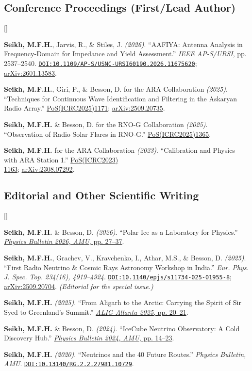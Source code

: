 \documentclass[10pt,letterpaper]{report}
\newcommand{\cvdate}[1]{{\normalfont\itshape\color{Muted}(#1)}}
\newcounter{cvitemrank}
\newenvironment{cvnumbered}[1]{%
  \setcounter{cvitemrank}{#1}%
  \begin{list}{\textcolor{Muted}{[\arabic{cvitemrank}]}}{%
    \setlength{\leftmargin}{2.25em}\setlength{\labelwidth}{1.65em}
    \setlength{\labelsep}{0.45em}\setlength{\itemindent}{0pt}
    \setlength{\itemsep}{0.3pt}\setlength{\topsep}{1.5pt}
    \setlength{\parsep}{0pt}\setlength{\partopsep}{0pt}}%
}{\end{list}}
\newcommand{\cvnumitem}{\item\addtocounter{cvitemrank}{-1}}
\newenvironment{cvpubnumbered}[1]{\begin{cvnumbered}{#1}\setlength{\itemsep}{2.2pt}\setlength{\topsep}{3pt}}{\end{cvnumbered}}
\newcommand{\doi}[1]{{\urlstyle{tt}\href{https://doi.org/#1}{\nolinkurl{DOI:#1}}}}
\newcommand{\arxiv}[1]{\href{https://arxiv.org/abs/#1}{arXiv:#1}}
\begin{document}
\subsection*{Conference Proceedings (First/Lead Author)}
\begin{cvpubnumbered}{4}
    \cvnumitem \textbf{Seikh, M.F.H.}, Jarvis, R., \& Stiles, J. \cvdate{2026}. ``AAFIYA: Antenna Analysis in Frequency-Domain for Impedance and Yield Assessment.'' \textit{IEEE AP-S/URSI}, pp. 2537--2540. \doi{10.1109/AP-S/USNC-URSI60190.2026.11675620}; \arxiv{2601.13583}.
    \cvnumitem \textbf{Seikh, M.F.H.}, Giri, P., \& Besson, D. for the ARA Collaboration \cvdate{2025}. ``Techniques for Continuous Wave Identification and Filtering in the Askaryan Radio Array.'' \href{https://pos.sissa.it/501/1171/pdf}{PoS(ICRC2025)1171}; \arxiv{2509.20735}.
    \cvnumitem \textbf{Seikh, M.F.H.} \& Besson, D. for the RNO-G Collaboration \cvdate{2025}. ``Observation of Radio Solar Flares in RNO-G.'' \href{https://pos.sissa.it/501/1365/pdf}{PoS(ICRC2025)1365}.
    \cvnumitem \textbf{Seikh, M.F.H.} for the ARA Collaboration \cvdate{2023}. ``Calibration and Physics with ARA Station 1.''
    \href{https://pos.sissa.it/444/1163/}{PoS(ICRC2023)\\1163}; \arxiv{2308.07292}.
\end{cvpubnumbered}

\subsection*{Editorial and Other Scientific Writing}
\begin{cvpubnumbered}{5}
    \cvnumitem \textbf{Seikh, M.F.H.} \& Besson, D. \cvdate{2026}. ``Polar Ice as a Laboratory for Physics.'' \href{https://drive.google.com/file/d/1eny09TjrDmNsoqKf86RbFbMdMi_LdEsB/view?usp=share_link}{\textit{Physics Bulletin 2026, AMU}, pp. 27--37}.
    \cvnumitem \textbf{Seikh, M.F.H.}, Grachev, V., Kravchenko, I., Athar, M.S., \& Besson, D. \cvdate{2025}. ``First Radio Neutrino \& Cosmic Rays Astronomy Workshop in India.'' \textit{Eur. Phys. J. Spec. Top. 234(16), 4919--4924}. \doi{10.1140/epjs/s11734-025-01955-8}; \arxiv{2509.20704}. \textit{(Editorial for the special issue.)}
    \cvnumitem \textbf{Seikh, M.F.H.} \cvdate{2025}. ``From Aligarh to the Arctic: Carrying the Spirit of Sir Syed to Greenland's Summit.'' \href{https://www.amuatl.org/publications/1}{\textit{ALIG Atlanta 2025}, pp. 20--21}.
    \cvnumitem \textbf{Seikh, M.F.H.} \& Besson, D. \cvdate{2024}. ``IceCube Neutrino Observatory: A Cold Discovery Hub.'' \href{https://drive.google.com/file/d/1q1vm4tf2Z8iK_Iw3n3kVayBnP7K6tHQI/view?usp=sharing}{\textit{Physics Bulletin 2024, AMU}, pp. 14--23}.
    \cvnumitem \textbf{Seikh, M.F.H.} \cvdate{2020}. ``Neutrinos and the 40 Future Routes.'' \textit{Physics Bulletin, AMU}. \doi{10.13140/RG.2.2.27981.10729}.
\end{cvpubnumbered}
\end{document}
